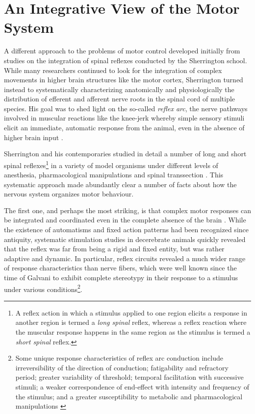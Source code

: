 \section{An Integrative View of the Motor System}

A different approach to the problems of motor control developed initially from studies on the integration of spinal reflexes conducted by the Sherrington school. While many researchers continued to look for the integration of complex movements in higher brain structures like the motor cortex, Sherrington turned instead to systematically characterizing anatomically and physiologically the distribution of efferent \cite{Sherrington1892} and afferent \cite{Sherrington1893a} nerve roots in the spinal cord of multiple species. His goal was to shed light on the so-called \emph{reflex arc}, the nerve pathways involved in muscular reactions like the knee-jerk whereby simple sensory stimuli elicit an immediate, automatic response from the animal, even in the absence of higher brain input \cite{Sherrington1893b}.

Sherrington and his contemporaries studied in detail a number of long and short spinal reflexes\footnote{A reflex action in which a stimulus applied to one region elicits a response in another region is termed a \emph{long spinal} reflex, whereas a reflex reaction where the muscular response happens in the same region as the stimulus is termed a \emph{short spinal} reflex.} in a variety of model organisms under different levels of anesthesia, pharmacological manipulations and spinal transsection \cite{Sherrington1903}. This systematic approach made abundantly clear a number of facts about how the nervous system organizes motor behaviour.

The first one, and perhaps the most striking, is that complex motor responses can be integrated and coordinated even in the complete absence of the brain \cite{Sherrington1906}. While the existence of automatisms and fixed action patterns had been recognized since antiquity, systematic stimulation studies in decerebrate animals quickly revealed that the reflex was far from being a rigid and fixed entity, but was rather adaptive and dynamic. In particular, reflex circuits revealed a much wider range of response characteristics than nerve fibers, which were well known since the time of Galvani to exhibit complete stereotypy in their response to a stimulus under various conditions\footnote{Some unique response characteristics of reflex arc conduction include irreversibility of the direction of conduction; fatigability and refractory period; greater variability of threshold; temporal facilitation with successive stimuli; a weaker correspondence of end-effect with intensity and frequency of the stimulus; and a greater susceptibility to metabolic and pharmacological manipulations \cite[p.14]{Sherrington1906}}.

